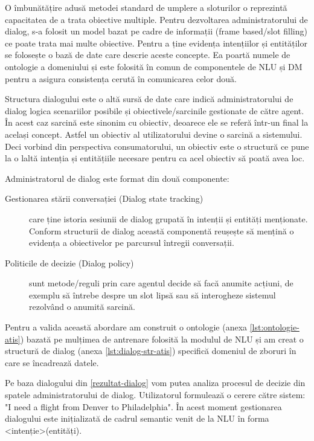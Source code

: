 O îmbunătățire adusă metodei standard de umplere a sloturilor o reprezintă capacitatea de a trata obiective multiple.
Pentru dezvoltarea administratorului de dialog, s-a folosit un model bazat pe cadre de informații (frame based/slot filling) ce poate trata mai multe obiective.
Pentru a ține evidența intențiilor și entităților se folosește o bază de date care descrie aceste concepte. Ea poartă numele de ontologie a domeniului și este folosită în comun de componentele de NLU și DM pentru a asigura consistența cerută în comunicarea celor două.

Structura dialogului este o altă sursă de date care indică administratorului de dialog logica scenariilor posibile și obiectivele/sarcinile gestionate de către agent. În acest caz sarcină este sinonim cu obiectiv, deoarece ele se referă într-un final la același concept. Astfel un obiectiv al utilizatorului devine o sarcină a sistemului. Deci vorbind din perspectiva consumatorului, un obiectiv este o structură ce pune la o laltă intenția și entitățiile necesare pentru ca acel obiectiv să poată avea loc.

Administratorul de dialog este format din două componente: 
\begin{description}
	\item[Gestionarea stării conversației (Dialog state tracking)] care ține istoria sesiunii de dialog grupată în intenții și entități menționate. Conform structurii de dialog această componentă reușește să mențină o evidența a obiectivelor pe parcursul întregii conversații.
	\item[Politicile de decizie (Dialog policy)] sunt metode/reguli prin care agentul decide să facă anumite acțiuni, de exemplu să întrebe despre un slot lipsă sau să interogheze sistemul rezolvând o anumită sarcină.
\end{description}

Pentru a valida această abordare am construit o ontologie (anexa \ref{lst:ontologie-atis}) bazată pe mulțimea de antrenare folosită la modulul de NLU și am creat o structură de dialog (anexa \ref{lst:dialog-str-atis}) specifică domeniul de zboruri în care se încadrează datele.

Pe baza dialogului din \ref{rezultat-dialog} vom putea analiza procesul de decizie din spatele administratorului de dialog.
Utilizatorul formulează o cerere către sistem: "I need a flight from Denver to Philadelphia". În acest moment gestionarea dialogului este inițializată de cadrul semantic venit de la NLU în forma <intenție>(entități).

